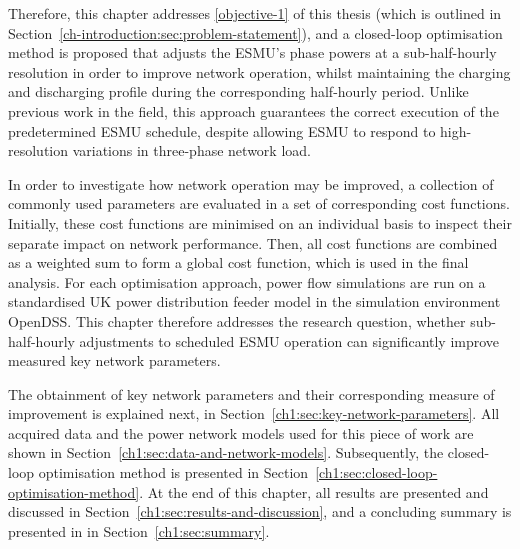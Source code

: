 Therefore, this chapter addresses \ref{objective-1} of this thesis (which is outlined in Section~\ref{ch-introduction:sec:problem-statement}), and a closed-loop optimisation method is proposed that adjusts the ESMU's phase powers at a sub-half-hourly resolution in order to improve network operation, whilst maintaining the charging and discharging profile during the corresponding half-hourly period.
Unlike previous work in the field, this approach guarantees the correct execution of the predetermined ESMU schedule, despite allowing ESMU to respond to high-resolution variations in three-phase network load.

In order to investigate how network operation may be improved, a collection of commonly used parameters are evaluated in a set of corresponding cost functions.
Initially, these cost functions are minimised on an individual basis to inspect their separate impact on network performance.
Then, all cost functions are combined as a weighted sum to form a global cost function, which is used in the final analysis.
For each optimisation approach, power flow simulations are run on a standardised UK power distribution feeder model in the simulation environment OpenDSS.
This chapter therefore addresses the research question, whether sub-half-hourly adjustments to scheduled ESMU operation can significantly improve measured key network parameters.

The obtainment of key network parameters and their corresponding measure of improvement is explained next, in Section~\ref{ch1:sec:key-network-parameters}.
All acquired data and the power network models used for this piece of work are shown in Section~\ref{ch1:sec:data-and-network-models}.
Subsequently, the closed-loop optimisation method is presented in Section~\ref{ch1:sec:closed-loop-optimisation-method}.
At the end of this chapter, all results are presented and discussed in Section~\ref{ch1:sec:results-and-discussion}, and a concluding summary is presented in in Section~\ref{ch1:sec:summary}.
